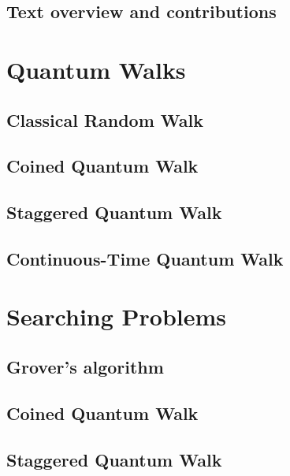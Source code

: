 \documentclass[
oneside,
11pt, a4paper,
footinclude=true,
headinclude=true,
cleardoublepage=empty
]{scrbook}
\begin{document}
\section{Text overview and contributions}


\chapter{Quantum Walks}\label{chap:QuantumWalks}
\section{Classical Random Walk}\label{sec:chap3ClassicalWalk}

\section{Coined Quantum Walk}\label{sec:chap3Coinedwalk}

\section{Staggered Quantum Walk}\label{sec:chap3StagWalk}

\section{Continuous-Time Quantum Walk}\label{sec:chap3Contwalk}



\chapter{Searching Problems}\label{chap:searchingProblems}
\section{Grover's algorithm}\label{sec:GrovSearchSimul}

\section{Coined Quantum Walk}\label{sec:CoinedSearchSimul}

\section{Staggered Quantum Walk}\label{sec:StagSearchSimul}

\end{document}

